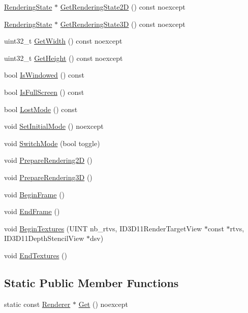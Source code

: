 \begin{DoxyCompactItemize}
\item 
\hyperlink{structmage_1_1_rendering_state}{Rendering\+State} $\ast$ \hyperlink{classmage_1_1_renderer_a4259de775cde2ce71b426f8e88a3afe2}{Get\+Rendering\+State2D} () const noexcept
\item 
\hyperlink{structmage_1_1_rendering_state}{Rendering\+State} $\ast$ \hyperlink{classmage_1_1_renderer_afde0b947dfcfea3515f6ddbfc25b8253}{Get\+Rendering\+State3D} () const noexcept
\item 
uint32\+\_\+t \hyperlink{classmage_1_1_renderer_a140938e7d5f576163d39ce249ebda99f}{Get\+Width} () const noexcept
\item 
uint32\+\_\+t \hyperlink{classmage_1_1_renderer_adc6940516d809d1916c627d6ce3837fe}{Get\+Height} () const noexcept
\item 
bool \hyperlink{classmage_1_1_renderer_a1de1804c1eedae7dc12435a520a10b9c}{Is\+Windowed} () const
\item 
bool \hyperlink{classmage_1_1_renderer_a5ae3220e19c68f47a8e4d55e3ced4694}{Is\+Full\+Screen} () const
\item 
bool \hyperlink{classmage_1_1_renderer_afdde83a1e2bc9288f000fb2575c525d0}{Lost\+Mode} () const
\item 
void \hyperlink{classmage_1_1_renderer_aff4e08af2ab697c53f1ede6546a86d19}{Set\+Initial\+Mode} () noexcept
\item 
void \hyperlink{classmage_1_1_renderer_a9004ab608659188900c808eacb5f873c}{Switch\+Mode} (bool toggle)
\item 
void \hyperlink{classmage_1_1_renderer_a716c5ef70f425269de95db07c9ecdbfa}{Prepare\+Rendering2D} ()
\item 
void \hyperlink{classmage_1_1_renderer_a9c76ba66a275c0d74f250955e7781f77}{Prepare\+Rendering3D} ()
\item 
void \hyperlink{classmage_1_1_renderer_ac9adf3be8c7201e4df8c5f9e049dc43d}{Begin\+Frame} ()
\item 
void \hyperlink{classmage_1_1_renderer_a38be3325e99a447340a048db19e6cf07}{End\+Frame} ()
\item 
void \hyperlink{classmage_1_1_renderer_a2ffbc529a9f57ebd724273bbf17413fc}{Begin\+Textures} (U\+I\+NT nb\+\_\+rtvs, I\+D3\+D11\+Render\+Target\+View $\ast$const $\ast$rtvs, I\+D3\+D11\+Depth\+Stencil\+View $\ast$dsv)
\item 
void \hyperlink{classmage_1_1_renderer_a80cfd903143b94348bc2c0c841831ff3}{End\+Textures} ()
\end{DoxyCompactItemize}
\subsection*{Static Public Member Functions}
\begin{DoxyCompactItemize}
\item 
static const \hyperlink{classmage_1_1_renderer}{Renderer} $\ast$ \hyperlink{classmage_1_1_renderer_a84ad465ae4ecfa2c0e9334cadb82d269}{Get} () noexcept
\end{DoxyCompactItemize}
